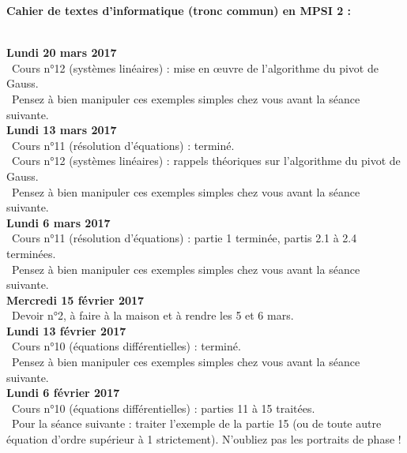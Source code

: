 \documentclass[12pt,a4paper]{article}
\begin{document}
\begin{center}
\Large\bf Cahier de textes d'informatique (tronc commun) en MPSI 2 :
\end{center}
\vspace{1cm}
\vspace{.4cm}\\

\noindent\textbf{Lundi 20 mars 2017}\\
\bu\ Cours n°12 (systèmes linéaires) : mise en {\oe}uvre de l'algorithme du pivot de Gauss.\\
\bu\ Pensez à bien manipuler ces exemples simples chez vous avant la séance suivante. \vspace{.4cm}\\

\noindent\textbf{Lundi 13 mars 2017}\\
\bu\ Cours n°11 (résolution d'équations) : terminé. \\
\bu\ Cours n°12 (systèmes linéaires) : rappels théoriques sur l'algorithme du pivot de Gauss.\\
\bu\ Pensez à bien manipuler ces exemples simples chez vous avant la séance suivante. \vspace{.4cm}\\

\noindent\textbf{Lundi 6 mars 2017}\\
\bu\ Cours n°11 (résolution d'équations) : partie 1 terminée, partis 2.1 à 2.4 terminées. \\
\bu\ Pensez à bien manipuler ces exemples simples chez vous avant la séance suivante. \vspace{.4cm}\\

\noindent\textbf{Mercredi 15 février 2017}\\
\bu\ Devoir n°2, à faire à la maison et à rendre les 5 et 6 mars. \vspace{.4cm}\\

\noindent\textbf{Lundi 13 février 2017}\\
\bu\ Cours n°10 (équations différentielles) : terminé. \\
\bu\ Pensez à bien manipuler ces exemples simples chez vous avant la séance suivante. \vspace{.4cm}\\

\noindent\textbf{Lundi 6 février 2017}\\
\bu\ Cours n°10 (équations différentielles) : parties 11 à 15 traitées. \\
\bu\ Pour la séance suivante : traiter l'exemple de la partie 15 (ou de toute autre équation d'ordre supérieur à 1 strictement). N'oubliez pas les portraits de phase ! \vspace{.4cm}\\
\end{document}
